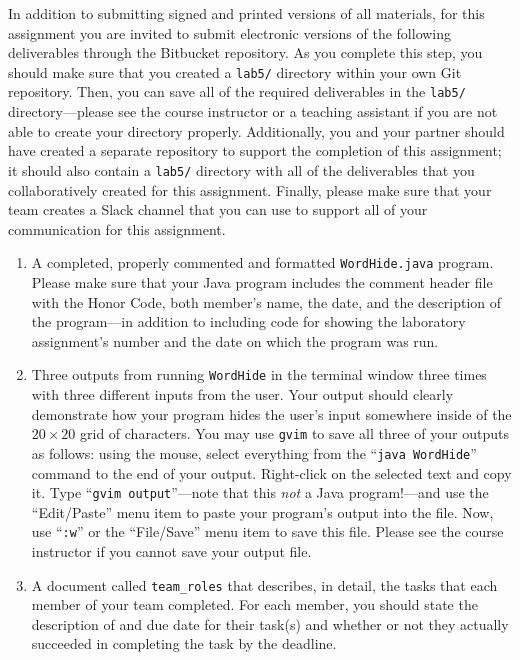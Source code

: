In addition to submitting signed and printed versions of all materials, for this assignment you are invited to submit
electronic versions of the following deliverables through the Bitbucket repository. As you complete this step, you
should make sure that you created a {\tt lab5/} directory within your own Git repository.  Then, you can save all of the
required deliverables in the {\tt lab5/} directory---please see the course instructor or a teaching assistant if you are
not able to create your directory properly. Additionally, you and your partner should have created a separate repository
to support the completion of this assignment; it should also contain a {\tt lab5/} directory with all of the
deliverables that you collaboratively created for this assignment. Finally, please make sure that your team creates a
Slack channel that you can use to support all of your communication for this assignment.

\vspace*{-.1in}
\begin{enumerate}

  \itemsep0in

        \item A completed, properly commented and formatted {\tt WordHide.java} program. Please make sure that your Java
          program includes the comment header file with the Honor Code, both member's name, the date, and the
          description of the program---in addition to including code for showing the laboratory assignment's number and
          the date on which the program was run.

        \item Three outputs from running {\tt WordHide} in the terminal window three times with three different inputs
          from the user. Your output should clearly demonstrate how your program hides the user's input somewhere inside
          of the $20 \times 20$ grid of characters.  You may use {\tt gvim} to save all three of your outputs as
          follows: using the mouse, select everything from the ``{\tt java WordHide}'' command to the end of your
          output.  Right-click on the selected text and copy it.  Type ``{\tt gvim output}''---note that this {\em not}
          a Java program!---and use the ``Edit/Paste'' menu item to paste your program's output into the file.  Now, use
          ``{\tt :w}'' or the ``File/Save'' menu item to save this file. Please see the course instructor if you cannot
          save your output file.

        \item A document called {\tt team\_roles} that describes, in detail, the tasks that each member of your team
          completed. For each member, you should state the description of and due date for their task(s) and whether or
          not they actually succeeded in completing the task by the deadline.

\end{enumerate}

